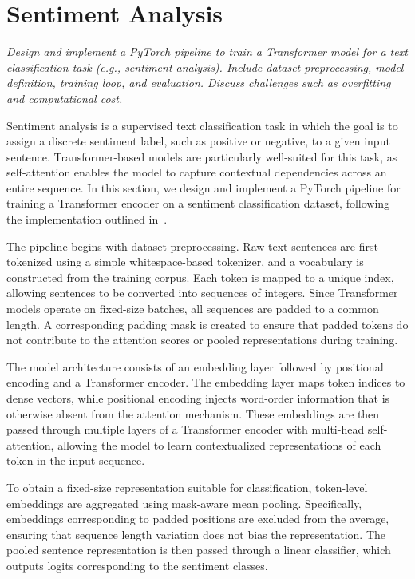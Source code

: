 \section{Sentiment Analysis}
\textit{Design and implement a PyTorch pipeline to train a Transformer model for a text
classification task (e.g., sentiment analysis). Include dataset preprocessing, model
definition, training loop, and evaluation. Discuss challenges such as overfitting and
computational cost.}

Sentiment analysis is a supervised text classification task
in which the goal is to assign a discrete sentiment label,
such as positive or negative, to a given input sentence.
Transformer-based models are particularly well-suited for
this task, as self-attention enables the model to capture
contextual dependencies across an entire sequence.
In this section, we design and implement a PyTorch pipeline
for training a Transformer encoder on a sentiment
classification dataset, following the implementation
outlined in~\cite{HowUsePyTorch}.

The pipeline begins with dataset preprocessing.
Raw text sentences are first tokenized using a simple
whitespace-based tokenizer, and a vocabulary is constructed
from the training corpus.
Each token is mapped to a unique index, allowing sentences
to be converted into sequences of integers.
Since Transformer models operate on fixed-size batches,
all sequences are padded to a common length.
A corresponding padding mask is created to ensure that
padded tokens do not contribute to the attention scores
or pooled representations during training.

The model architecture consists of an embedding layer
followed by positional encoding and a Transformer encoder.
The embedding layer maps token indices to dense vectors,
while positional encoding injects word-order information
that is otherwise absent from the attention mechanism.
These embeddings are then passed through multiple layers
of a Transformer encoder with multi-head self-attention,
allowing the model to learn contextualized representations
of each token in the input sequence.

To obtain a fixed-size representation suitable for
classification, token-level embeddings are aggregated
using mask-aware mean pooling.
Specifically, embeddings corresponding to padded positions
are excluded from the average, ensuring that sequence length
variation does not bias the representation.
The pooled sentence representation is then passed through
a linear classifier, which outputs logits corresponding
to the sentiment classes.

